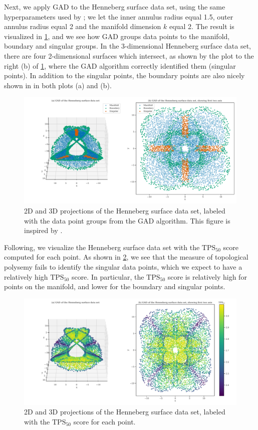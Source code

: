 Next, we apply GAD to the Henneberg surface data set, using the same hyperparameters used by \cite{stolz2020geometric}; we let the inner annulus radius equal 1.5, outer annulus radius equal 2 and the manifold dimension $k$ equal 2. The result is visualized in \cref{fig:gad-henneberg-3d}, and we see how GAD groups data points to the manifold, boundary and singular groups. In the 3-dimensional Henneberg surface data set, there are four 2-dimensional surfaces which intersect, as shown by the plot to the right (b) of \cref{fig:gad-henneberg-3d}, where the GAD algorithm correctly identified them (singular points). In addition to the singular points, the boundary points are also nicely shown in in both plots (a) and (b).
\begin{figure}[H]
    \centering
    \includegraphics[width=\textwidth]{thesis/figures/gad-henneberg-3d.pdf}
    \caption{2D and 3D projections of the Henneberg surface data set, labeled with the data point groups from the GAD algorithm. This figure is inspired by \cite[Figure 3]{stolz2020geometric}.}
    \label{fig:gad-henneberg-3d}
\end{figure}

Following, we visualize the Henneberg surface data set with the $\text{TPS}_{50}$ score computed for each point. As shown in \cref{fig:gad-henneberg-3d-tps-50}, we see that the measure of topological polysemy fails to identify the singular data points, which we expect to have a relatively high $\text{TPS}_{50}$ score. In particular, the $\text{TPS}_{50}$ score is relatively high for points on the manifold, and lower for the boundary and singular points.
\begin{figure}[H]
    \centering
    \includegraphics[width=\textwidth]{thesis/figures/gad-henneberg-3d-tps-50.pdf}
    \caption{2D and 3D projections of the Henneberg surface data set, labeled with the $\text{TPS}_{50}$ score for each point.}
    \label{fig:gad-henneberg-3d-tps-50}
\end{figure}

